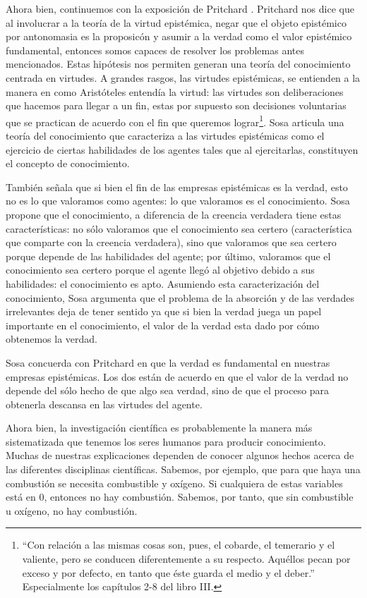 \documentclass[12pt]{article}
\begin{document}
Ahora bien, continuemos con la exposición de Pritchard \cite{Pritchard2021}. Pritchard nos dice que al involucrar a la teoría de la virtud epistémica, negar que el objeto epistémico por antonomasia es la proposicón y asumir a la verdad como el valor epistémico fundamental, entonces somos capaces de resolver los problemas antes mencionados. Estas hipótesis nos permiten generan una teoría del conocimiento centrada en virtudes. A grandes rasgos, las virtudes epistémicas, se entienden a la manera en como Aristóteles entendía la virtud: las virtudes son deliberaciones que hacemos para llegar a un fin, estas por supuesto son decisiones voluntarias que se practican de acuerdo con el fin que queremos lograr\footnote{``Con relación a las mismas cosas son, pues, el cobarde, el temerario y el valiente, pero se conducen diferentemente a su respecto. Aquéllos pecan por exceso y por defecto, en tanto que éste guarda el medio y el deber.'' \cite{aristotelesnico} Especialmente los capítulos 2-8 del libro III.}. Sosa \citeyear{Sosa2017-SOSE} articula una teoría del conocimiento que caracteriza a las virtudes epistémicas  como el ejercicio de ciertas habilidades de los agentes tales que al ejercitarlas, constituyen el concepto de conocimiento. 

También señala que si bien el fin de las empresas epistémicas es la verdad, esto no es lo que valoramos como agentes: lo que valoramos es el conocimiento. Sosa \citeyear[pp. 11-113]{Sosa2017-SOSE} propone que el conocimiento, a diferencia de la creencia verdadera tiene estas características: no sólo valoramos que el conocimiento sea certero (característica que comparte con la creencia verdadera), sino que valoramos que sea certero porque depende de las habilidades del agente; por último, valoramos que el conocimiento sea certero porque el agente llegó al objetivo debido a sus habilidades: el conocimiento es apto. Asumiendo esta caracterización del conocimiento, Sosa argumenta que el problema de la absorción y de las verdades irrelevantes deja de tener sentido ya que si bien la verdad juega un papel importante en el conocimiento, el valor de la verdad esta dado por cómo obtenemos la verdad.

Sosa concuerda con Pritchard en que la verdad es fundamental en nuestras empresas epistémicas. Los dos están de acuerdo en que el valor de la verdad no depende del sólo hecho de que algo sea verdad, sino de que el proceso para obtenerla descansa en las virtudes del agente. 

Ahora bien, la investigación científica es probablemente la manera más sistematizada que tenemos los seres humanos para producir conocimiento. Muchas de nuestras explicaciones dependen de conocer algunos hechos acerca de las diferentes disciplinas científicas. Sabemos, por ejemplo, que para que haya una combustión se necesita combustible y oxígeno. Si cualquiera de estas variables está en 0, entonces no hay combustión. Sabemos, por tanto, que sin combustible u oxígeno, no hay combustión.
\end{document}
